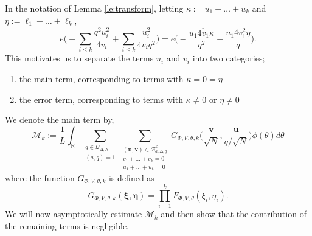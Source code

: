 \documentclass[12pt,reqno]{amsart}
\theoremstyle{plain}
\numberwithin{equation}{section}
\numberwithin{figure}{section}
\theoremstyle{plain}
\theoremstyle{definition}
\theoremstyle{remark}
\newcommand{\Niclas}[1]{{\color{blue} \sf Niclas: [#1]}}
\begin{document}
In the notation of Lemma \ref{le:transform},
letting $ \kappa:= u_1 + \ldots + u_k$
and $\eta:= \ell_1 + \ldots + \ell_k$,
$$
  e\Big(- \sum_{i \leq k}
  \frac{\overline{q}^2 u_i^2}{4 v_i}
  + \sum_{i \leq k} \frac{u_i^2}{4 v_i q^2} \Big)
  =  
  e\Big(- \frac{u_1 \overline{4 v_1} 
  \kappa }{q^2} + 
  \frac{u_1 \overline{4 v_1^2} \eta}{q} 
  \Big).
$$
This motivates us to separate the terms 
$u_i$ and $v_i$ into two categories; 
\begin{enumerate}
\item [a.] the main term, corresponding to terms with $\kappa = 0 = \eta$
\item [b.] the error term, corresponding to terms with $\kappa \neq 0$ or $\eta \neq 0$
\end{enumerate}
We denote the main term by, 
\begin{equation} \label{eq:maintt}
\mathcal{M}_k:=\frac{1}{L} \int_{\mathbb{R}} 
\sum_{\substack{q \in \mathcal{Q}_{\Delta, N} \\ (a,q) = 1}} \sum_{\substack{(\mathbf{u}, \mathbf{v}) \in \mathcal{B}_{a, \Delta, q}^{k} 
\\ v_1 + \ldots + v_k = 0 \\ u_1 + \ldots + u_k = 0}} 
G_{\Phi, V, \theta, k}
\Big ( \frac{\boldsymbol{v}}{\sqrt{N}}, 
\frac{\boldsymbol{u}}{q / \sqrt{N}} \Big )\phi(\theta) d \theta
\end{equation}
where the function $G_{\Phi, V, \theta, k}$ 
is defined as
$$
G_{\Phi, V, \theta, k}(\boldsymbol{\xi},\boldsymbol{\eta}) = \prod_{i = 1}^{k} F_{\Phi, V, \theta} ( \xi_i, \eta_i).
$$
We will now asymptotically estimate $\mathcal{M}_k$ and then show that
the contribution of the remaining terms is negligible. 
\end{document}
